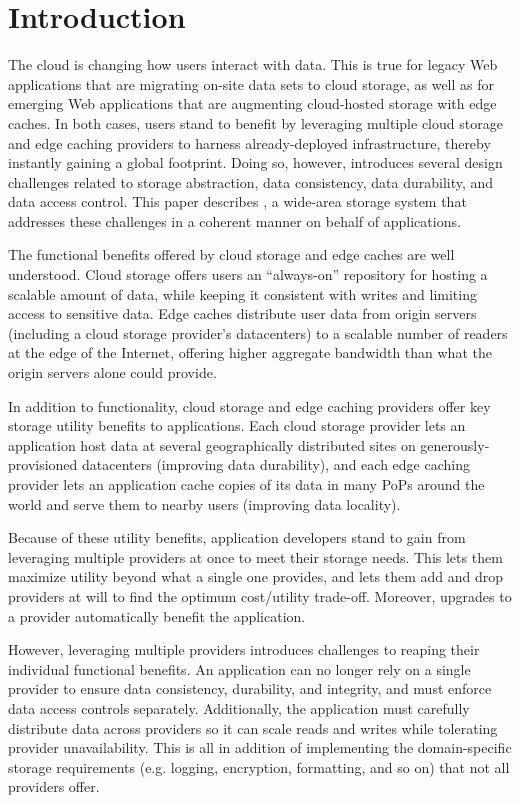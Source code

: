 \section{Introduction}
\label{sec:introduction}

The cloud is changing how users interact with data.  This is true for legacy Web applications that are migrating on-site data sets to cloud storage, as well as for emerging Web applications that are augmenting cloud-hosted storage with edge caches.  In both cases, users stand to benefit by leveraging multiple cloud storage and edge caching providers to harness already-deployed infrastructure, thereby instantly gaining a global footprint.  Doing so, however, introduces several design challenges related to storage abstraction, data consistency, data durability, and data access control.  This paper describes \Syndicate, a wide-area storage system that addresses these challenges in a coherent manner on behalf of applications.

The functional benefits offered by cloud storage and edge caches are well understood.  Cloud storage offers users an ``always-on'' repository for hosting a scalable amount of data, while keeping it consistent with writes and limiting access to sensitive data.  Edge caches distribute user data from origin servers (including a cloud storage provider's datacenters) to a scalable number of readers at the edge of the Internet, offering higher aggregate bandwidth than what the origin servers alone could provide.

In addition to functionality, cloud storage and edge caching providers offer key storage utility benefits to applications.  Each cloud storage provider lets an application host data at several geographically distributed sites on generously-provisioned datacenters (improving data durability), and each edge caching provider lets an application cache copies of its data in many PoPs around the world and serve them to nearby users (improving data locality).

Because of these utility benefits, application developers stand to gain from leveraging multiple providers at once to meet their storage needs.  This lets them maximize
utility beyond what a single one provides, and lets them add and drop providers at will to find the optimum cost/utility trade-off.  Moreover, upgrades to a provider automatically benefit the application.

However, leveraging multiple providers introduces challenges to reaping their individual functional benefits.  An application can no longer rely on a single provider to ensure 
data consistency, durability, and integrity, and must enforce data access controls separately.  Additionally, the application must carefully distribute data across providers so it 
can scale reads and writes while tolerating provider unavailability.
This is all in addition of implementing the domain-specific storage requirements (e.g. logging,
encryption, formatting, and so on) that not all providers offer.

